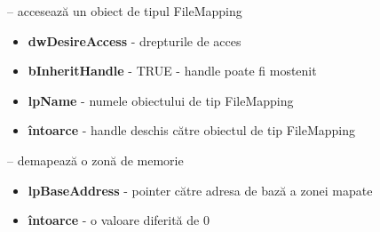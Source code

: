 \documentclass{refcard.cs.pub.ro}
\begin{document}
\begin{multicols*}{3}
 -- accesează un obiect de tipul FileMapping
\begin{itemize}
  \item \textbf{dwDesireAccess} - drepturile de acces
  \item \textbf{bInheritHandle} - TRUE - handle poate fi mostenit
  \item \textbf{lpName} - numele obiectului de tip FileMapping
  \item \textbf{întoarce} - handle deschis către obiectul de tip FileMapping
\end{itemize}

 -- demapează o zonă de memorie
\begin{itemize}
  \item \textbf{lpBaseAddress} - pointer către adresa de bază a zonei mapate
  \item \textbf{întoarce} - o valoare diferită de 0
\end{itemize}

\end{multicols*}
\end{document}
